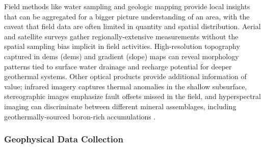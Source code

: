 Field methods like water sampling and geologic mapping provide local insights that can be aggregated for a bigger picture understanding of an area, with the caveat that field data are often limited in quantity and spatial distribution. Aerial and satellite surveys gather regionally-extensive measurements without the spatial sampling bias implicit in field activities. High-resolution topography captured in \acrlong{dem}s (\acrshort{dem}s) and gradient (slope) maps can reveal morphology patterns tied to surface water drainage and recharge potential for deeper geothermal systems. Other optical products provide additional information of value; infrared imagery captures thermal anomalies in the shallow subsurface, stereographic images emphasize fault offsets missed in the field, and hyperspectral imaging can discriminate between different mineral assemblages, including geothermally-sourced boron-rich accumulations .

\subsubsection{Geophysical Data Collection}\label{ch2:geophysical_data}

